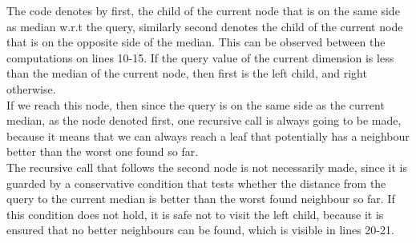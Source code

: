 \noindent The code denotes by first, the child of the current node that is on the same side as median w.r.t the query, similarly second denotes the child of the current node that is on the opposite side of the median. This can be observed between the computations on lines 10-15. If the query value of the current dimension is less than the median of the current node, then first is the left child, and right otherwise. 
\\[2mm]
If we reach this node, then since the query is on the same side as the current median, as the node denoted first, one recursive call is always going to be made, because it means that we can always reach a leaf that potentially has a neighbour better than the worst one found so far.
\\[2mm]
The recursive call that follows the second node is not necessarily made, since it is guarded by a conservative condition that tests whether the distance from the query to the current median is better than the worst found neighbour so far. If this condition does not hold, it is safe not to visit the left child, because it is ensured that no better neighbours can be found, which is visible in lines 20-21. 


